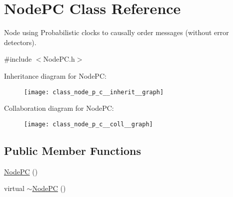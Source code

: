 \hypertarget{class_node_p_c}{}\section{Node\+PC Class Reference}
\label{class_node_p_c}


Node using Probabilistic clocks to causally order messages (without error detectors).  




{\ttfamily \#include $<$Node\+P\+C.\+h$>$}



Inheritance diagram for Node\+PC\+:
\nopagebreak
\begin{figure}[H]
\begin{center}
\leavevmode
\texttt{[image: class\_node\_p\_c\_\_inherit\_\_graph]}
\end{center}
\end{figure}


Collaboration diagram for Node\+PC\+:
\nopagebreak
\begin{figure}[H]
\begin{center}
\leavevmode
\texttt{[image: class\_node\_p\_c\_\_coll\_\_graph]}
\end{center}
\end{figure}
\subsection*{Public Member Functions}
\begin{DoxyCompactItemize}
\item 
\hyperlink{class_node_p_c_a0b937d3f3d409fd1a8d1c15170d97675}{Node\+PC} ()
\item 
virtual \hyperlink{class_node_p_c_a823ec7244202157115f6d587c0c565dc}{$\sim$\+Node\+PC} ()
\end{DoxyCompactItemize}
